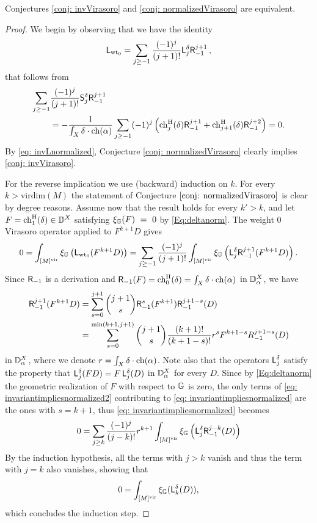 \documentclass[a4paper, 12pt]{amsart}
\begin{document}
\begin{proposition}\label{prop: normalizedvsinv}
Conjectures \ref{conj: invVirasoro} and \ref{conj: normalizedVirasoro} are equivalent.
\end{proposition}
\begin{proof}
We begin by observing that we have the identity
\begin{equation}\label{eq: invLnormalized}
\mathsf{L}_{{\mathrm{wt}_0}}=\sum_{j\geq -1}\frac{(-1)^j}{(j+1)!}{\mathsf{L}}_j^\delta \mathsf{R}_{-1}^{j+1}\,,
\end{equation}
that follows from
\begin{align*}
\sum_{j\geq -1}&\frac{(-1)^j}{(j+1)!}{\mathsf{S}}_j^\delta \mathsf{R}_{-1}^{j+1}\\
&=-\frac{1}{\int_X \delta\cdot \mathrm{ch}(\alpha)}\sum_{j\geq -1}(-1)^j\left( \mathrm{ch}^{\mathrm{H}}_j(\delta) \mathsf{R}_{-1}^{j+1}+\mathrm{ch}^{\mathrm{H}}_{j+1}(\delta)\mathsf{R}_{-1}^{j+2}\right)=0.
\end{align*}
By \eqref{eq: invLnormalized}, Conjecture \ref{conj: normalizedVirasoro} clearly implies \ref{conj: invVirasoro}.

For the reverse implication we use (backward) induction on $k$. For every $k>\mathrm{virdim}(M)$ the statement of Conjecture $\ref{conj: normalizedVirasoro}$ is clear by degree reasons. Assume now that the result holds for every $k'>k$, and let $F=\mathrm{ch}^{\mathrm{H}}_1(\delta)\in {\mathbb{D}}^X$ satisfying $\xi_{\mathbb{G}}(F)~=~0$ by \eqref{Eq:deltanorm}. The weight 0 Virasoro operator applied to $F^{k+1}D$ gives
\begin{equation}\label{eq: invariantimpliesnormalized}
0=\int_{[M]^{\mathrm{vir}}} \xi_{{\mathbb{G}}}\left(\mathsf{L}_{{\mathrm{wt}_0}}(F^{k+1}D)\right)=\sum_{j\geq -1}\frac{(-1)^j}{(j+1)!}\int_{[M]^{\mathrm{vir}}}\xi_{{\mathbb{G}}}\left({\mathsf{L}}_j^\delta \mathsf{R}_{-1}^{j+1}(F^{k+1}D)\right).
\end{equation}
Since $\mathsf{R}_{-1}$ is a derivation and $\mathsf{R}_{-1}(F)=\mathrm{ch}^{\mathrm{H}}_0(\delta)=\int_X \delta\cdot \mathrm{ch}(\alpha)$ in ${\mathbb{D}}^{X}_\alpha$, we have
\begin{align}\label{eq: invariantimpliesnormalized2}
\nonumber \mathsf{R}_{-1}^{j+1}(F^{k+1}D)&=\sum_{s=0}^{j+1} \binom{j+1}{s}\mathsf{R}_{-1}^s(F^{k+1})\mathsf{R}_{-1}^{j+1-s}(D)\\
&=\sum_{s=0}^{\min(k+1, j+1)}\binom{j+1}{s}\frac{(k+1)!}{(k+1-s)!}r^s F^{k+1-s}R_{-1}^{j+1-s}(D)
\end{align}
in ${\mathbb{D}}^{X}_{\alpha}$, where we denote $r=\int_X \delta\cdot \mathrm{ch}(\alpha)$. Note also that the operators ${\mathsf{L}}_j^\delta$ satisfy the property that ${\mathsf{L}}_{j}^\delta(F D)=F \,{\mathsf{L}}_{j}^\delta(D)$ in ${\mathbb{D}}^{X}_\alpha$ for every $D$. Since by \eqref{Eq:deltanorm} the geometric realization of $F$ with respect to ${\mathbb{G}}$ is zero, the only terms of \eqref{eq: invariantimpliesnormalized2} contributing to \eqref{eq: invariantimpliesnormalized} are the ones with $s=k+1$, thus  \eqref{eq: invariantimpliesnormalized} becomes
\[0=\sum_{j\geq k}\frac{(-1)^j}{(j-k)!} r^{k+1}\int_{[M]^{\mathrm{vir}}}\xi_{{\mathbb{G}}}\left({\mathsf{L}}_j^\delta \mathsf{R}_{-1}^{j-k}(D)\right)\]
By the induction hypothesis, all the terms with $j>k$ vanish and thus the term with $j=k$ also vanishes, showing that 
\[0=\int_{[M]^{\mathrm{vir}}} \xi_{{\mathbb{G}}}({\mathsf{L}}_k^\delta(D)),\]
which concludes the induction step.\qedhere
\end{proof}
\end{document}
